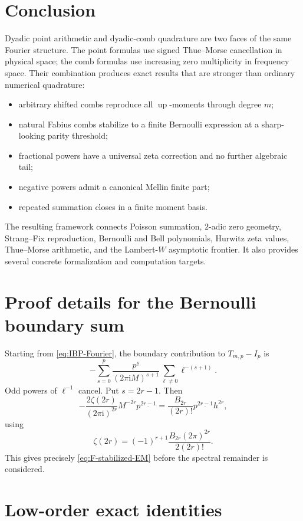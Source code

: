 \documentclass[11pt]{article}
\theoremstyle{definition}
\newcommand{\Up}{\operatorname{up}}
\newcommand{\ii}{\mathrm{i}}
\newcommand{\fall}[2]{#1^{\underline{#2}}}
\begin{document}
\section{Conclusion}

Dyadic point arithmetic and dyadic-comb quadrature are two faces of the same
Fourier structure.  The point formulas use signed Thue--Morse cancellation in
physical space; the comb formulas use increasing zero multiplicity in
frequency space.  Their combination produces exact results that are stronger
than ordinary numerical quadrature:
\begin{itemize}[leftmargin=2em]
\item arbitrary shifted combs reproduce all $\Up$-moments through degree $m$;
\item natural Fabius combs stabilize to a finite Bernoulli expression at a
sharp-looking parity threshold;
\item fractional powers have a universal zeta correction and no further
algebraic tail;
\item negative powers admit a canonical Mellin finite part;
\item repeated summation closes in a finite moment basis.
\end{itemize}
The resulting framework connects Poisson summation, $2$-adic zero geometry,
Strang--Fix reproduction, Bernoulli and Bell polynomials, Hurwitz zeta values,
Thue--Morse arithmetic, and the Lambert-$W$ asymptotic frontier.  It also
provides several concrete formalization and computation targets.

\appendix

\section{Proof details for the Bernoulli boundary sum}

Starting from \eqref{eq:IBP-Fourier}, the boundary contribution to
$T_{m,p}-I_p$ is
\[
 -\sum_{s=0}^{p}\frac{\fall p s}{(2\pi\ii M)^{s+1}}
 \sum_{\ell\ne0}\ell^{-(s+1)}.
\]
Odd powers of $\ell^{-1}$ cancel.  Put $s=2r-1$.  Then
\[
 -\frac{2\zeta(2r)}{(2\pi\ii)^{2r}}M^{-2r}
 \fall p{2r-1}
 =\frac{B_{2r}}{(2r)!}\fall p{2r-1}h^{2r},
\]
using
\[
 \zeta(2r)=(-1)^{r+1}\frac{B_{2r}(2\pi)^{2r}}{2(2r)!}.
\]
This gives precisely \eqref{eq:F-stabilized-EM} before the spectral remainder
is considered.

\section{Low-order exact identities}
\end{document}
